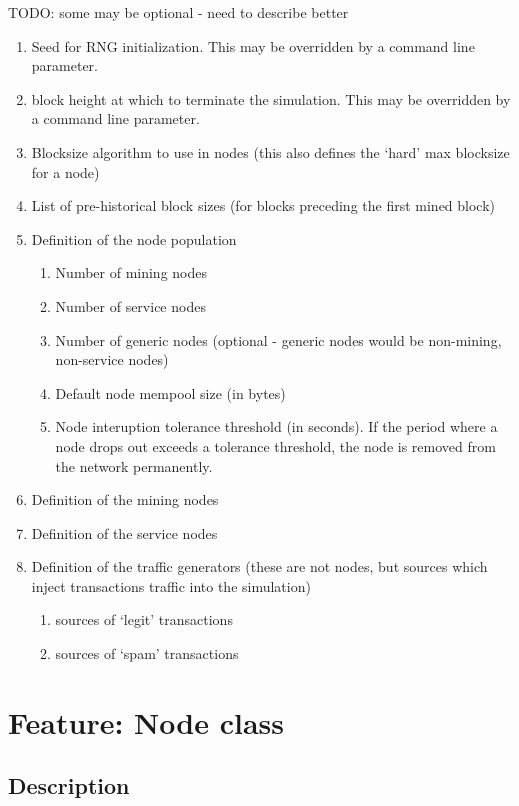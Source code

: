 \documentclass{scrreprt}
\begin{document}
TODO: some may be optional - need to describe better

\begin{enumerate}
   \item Seed for RNG initialization. This may be overridden by a command line parameter.
   \item block height at which to terminate the simulation. This may be overridden by a command line parameter.
   \item Blocksize algorithm to use in nodes (this also defines the `hard' max blocksize for a node)
   \item List of pre-historical block sizes (for blocks preceding the first mined block)
   \item Definition of the node population
      \begin{enumerate}
         \item Number of mining nodes
         \item Number of service nodes
         \item Number of generic nodes (optional - generic nodes would be non-mining, non-service nodes)
         \item Default node mempool size (in bytes)
         \item Node interuption tolerance threshold (in seconds). If the period where a node drops out exceeds a tolerance threshold, the node is removed from the network permanently.
      \end{enumerate}
   \item Definition of the mining nodes
   \item Definition of the service nodes
   \item Definition of the traffic generators (these are not nodes, but sources which inject transactions traffic into the simulation)
      \begin{enumerate}
         \item sources of `legit' transactions
         \item sources of `spam' transactions
      \end{enumerate}
\end{enumerate}



\section{Feature: Node class}

\subsection{Description}
\end{document}
